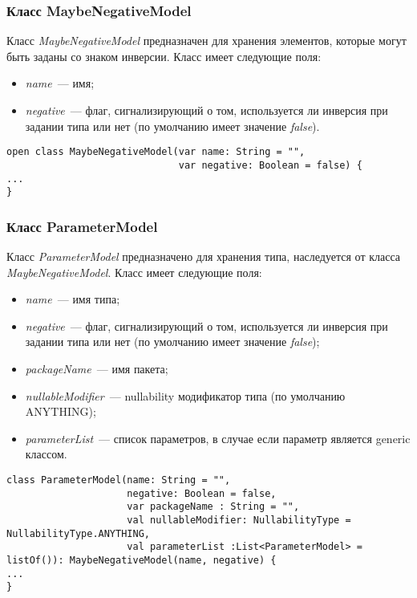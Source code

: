 \subsubsection{Класс MaybeNegativeModel}
\label{ssub:MaybeNegativeModel}
Класс \textit{MaybeNegativeModel} предназначен для хранения элементов, которые
могут быть заданы со знаком инверсии.
Класс имеет следующие поля:
\begin{itemize}
	\item \textit{name}~--- имя;
	\item \textit{negative}~--- флаг, сигнализирующий о том, используется ли
		  инверсия при задании типа или нет (по умолчанию имеет значение
		  \textit{false}).
\end{itemize}

\begin{lstlisting}[style={java}, label={lst:MaybeNegativeModel},
  caption={Класс MaybeNegativeModel}]
open class MaybeNegativeModel(var name: String = "",
                              var negative: Boolean = false) {
...
}
\end{lstlisting}
\subsubsection{Класс ParameterModel}
\label{ssub:ParameterModel}
Класс \textit{ParameterModel} предназначено для хранения типа, наследуется от
класса \textit{MaybeNegativeModel}.
Класс имеет следующие поля:
\begin{itemize}
	\item \textit{name}~--- имя типа;
	\item \textit{negative}~--- флаг, сигнализирующий о том, используется ли
		  инверсия при задании типа или нет (по умолчанию имеет значение
		  \textit{false});
	\item \textit{packageName}~--- имя пакета;
	\item \textit{nullableModifier}~--- nullability модификатор типа (по
		  умолчанию ANYTHING);
	\item \textit{parameterList}~--- список параметров, в случае если параметр является generic классом.
\end{itemize}

\begin{lstlisting}[style={java}, label={lst:ParameterModel},
  caption={Класс ParameterModel}]
class ParameterModel(name: String = "",
                     negative: Boolean = false,
                     var packageName : String = "",
                     val nullableModifier: NullabilityType = NullabilityType.ANYTHING,
                     val parameterList :List<ParameterModel> = listOf()): MaybeNegativeModel(name, negative) {
...
}
\end{lstlisting}
